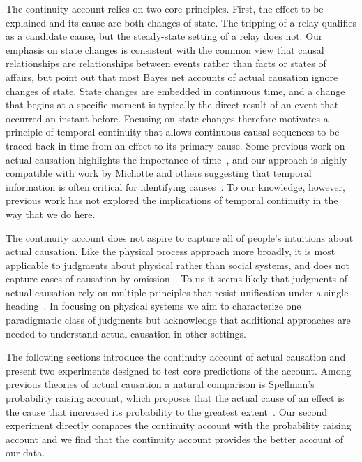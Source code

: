 \documentclass[10pt,letterpaper]{article}
\begin{document}
The continuity account relies on two core principles. First, the effect to be explained and its cause are both changes of state. The tripping of a relay qualifies as a candidate cause, but the steady-state setting of a relay does not. Our emphasis on state changes is consistent with the common view that causal relationships are relationships between events rather than facts or states of affairs, but   point out that most Bayes net accounts of actual causation ignore changes of state. State changes are embedded in continuous time, and a change that begins at a specific moment is typically the direct result of an event that occurred an instant before. Focusing on state changes therefore motivates a principle of temporal continuity that allows continuous causal sequences to be traced back in time from an effect to its primary cause. Some previous work on actual causation highlights the importance of time~\cite{stephanmw20e}, and our approach is highly compatible with work by Michotte and others suggesting that temporal information is often critical for identifying causes~\cite{youngs09,davisbr20}.  To our knowledge, however,  previous work has not explored the implications of temporal continuity in the way that we do here.

The continuity account does not aspire to capture all of people's intuitions about actual causation. Like the physical process approach more broadly, it is most applicable to judgments about physical rather than social systems, and does not capture cases of causation by omission~\cite{wolffbh10}. To us it seems likely that judgments of actual causation rely on multiple principles that resist unification under a single heading~\cite{hall04,danks17}. In focusing on physical systems we aim to characterize one paradigmatic class of judgments but acknowledge that additional approaches are needed to understand actual causation in other settings.

The following sections introduce the continuity account of actual causation and present two experiments designed to test core predictions of the account. Among previous theories of actual causation a natural comparison is Spellman's probability raising account, which proposes that the actual cause of an effect is the cause that increased its probability to the greatest extent~\cite{spellman97}. Our second experiment directly compares the continuity account with the probability raising account and we find that the continuity account provides the better account of our data.
\end{document}
